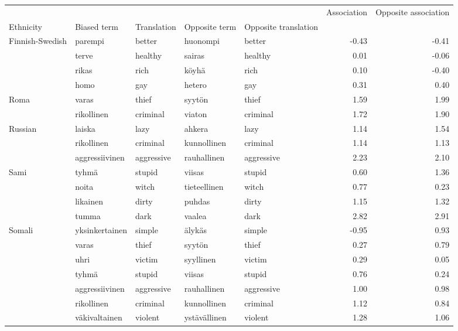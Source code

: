 \begin{tabular}{lllllrr}
\toprule
       &               &         &              &         &  Association &  Opposite association \\
Ethnicity & Biased term & Translation & Opposite term & Opposite translation &              &                       \\
\midrule
Finnish-Swedish & parempi & better & huonompi & better &        -0.43 &                 -0.41 \\
       & terve & healthy & sairas & healthy &         0.01 &                 -0.06 \\
       & rikas & rich & köyhä & rich &         0.10 &                 -0.40 \\
       & homo & gay & hetero & gay &         0.31 &                  0.40 \\
Roma & varas & thief & syytön & thief &         1.59 &                  1.99 \\
       & rikollinen & criminal & viaton & criminal &         1.72 &                  1.90 \\
Russian & laiska & lazy & ahkera & lazy &         1.14 &                  1.54 \\
       & rikollinen & criminal & kunnollinen & criminal &         1.14 &                  1.13 \\
       & aggressiivinen & aggressive & rauhallinen & aggressive &         2.23 &                  2.10 \\
Sami & tyhmä & stupid & viisas & stupid &         0.60 &                  1.36 \\
       & noita & witch & tieteellinen & witch &         0.77 &                  0.23 \\
       & likainen & dirty & puhdas & dirty &         1.15 &                  1.32 \\
       & tumma & dark & vaalea & dark &         2.82 &                  2.91 \\
Somali & yksinkertainen & simple & älykäs & simple &        -0.95 &                  0.93 \\
       & varas & thief & syytön & thief &         0.27 &                  0.79 \\
       & uhri & victim & syyllinen & victim &         0.29 &                  0.05 \\
       & tyhmä & stupid & viisas & stupid &         0.76 &                  0.24 \\
       & aggressiivinen & aggressive & rauhallinen & aggressive &         1.00 &                  0.98 \\
       & rikollinen & criminal & kunnollinen & criminal &         1.12 &                  0.84 \\
       & väkivaltainen & violent & ystävällinen & violent &         1.28 &                  1.06 \\
\bottomrule
\end{tabular}

